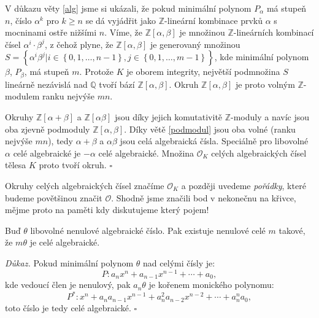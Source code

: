 \documentclass[12pt]{report}
\begin{document}
V důkazu věty \ref{alg} jsme si ukázali, že pokud minimální polynom $P_\alpha$ má stupeň $n$, číslo $\alpha^k$ pro $k \geqslant n$ se dá vyjádřit jako $\mathbb{Z}$-lineární kombinace prvků $\alpha$ s mocninami ostře nižšími $n$. Víme, že $\mathbb{Z}[\alpha,\beta]$ je množinou $\mathbb{Z}$-lineárních kombinací čísel $\alpha^i \cdot \beta^j$, z čehož plyne, že $\mathbb{Z}[\alpha,\beta]$ je generovaný množinou $S = \left\lbrace \alpha^i \beta^j \vert i \in \left\lbrace 0,1,\dots,n-1 \right\rbrace, j \in \left\lbrace 0,1,\dots,m-1 \right\rbrace \right\rbrace$, kde minimální polynom $\beta$, $P_\beta$, má stupeň $m$. Protože $K$ je oborem integrity, největší podmnožina $S$ lineárně nezávislá nad $\mathbb{Q}$ tvoří bází $\mathbb{Z}[\alpha,\beta]$. Okruh $\mathbb{Z}[\alpha,\beta]$ je proto volným $\mathbb{Z}$-modulem ranku nejvýše $mn$.

Okruhy $\mathbb{Z}[\alpha+\beta]$ a $\mathbb{Z}[\alpha \beta]$ jsou díky jejich komutativitě $\mathbb{Z}$-moduly a navíc jsou oba zjevně podmoduly $\mathbb{Z}[\alpha,\beta]$. Díky větě \ref{podmodul} jsou oba volné (ranku nejvýše $mn$), tedy $\alpha+\beta$ a $\alpha \beta$ jsou celá algebraická čísla. Speciálně pro libovolné $\alpha$ celé algebraické je $-\alpha$ celé algebraické. Množina $\mathcal{O}_K$ celých algebraických čísel tělesa $K$ proto tvoří okruh. \hfill $\square$\\

\begin{poznamka}
Okruhy celých algebraických čísel značíme $\mathcal{O}_K$ a později uvedeme \textit{pořádky}, které budeme povětšinou značit $\mathcal{O}$. Shodně jsme značili bod v nekonečnu na křivce, mějme proto na paměti kdy diskutujeme který pojem!
\end{poznamka}

\begin{lemma}\label{asob}
Buď $\theta$ libovolné nenulové algebraické číslo. Pak existuje nenulové celé $m$ takové, že $m \theta$ je celé algebraické.
\end{lemma}
\noindent \textit{Důkaz.} Pokud minimální polynom $\theta$ nad celými čísly je:
\begin{equation*}
P : a_n x^n + a_{n-1} x^{n-1} + \cdots + a_0,
\end{equation*}
kde vedoucí člen je nenulový, pak $a_n \theta$ je kořenem monického polynomu:
\begin{equation*}
P^* : x^n +a_n  a_{n-1} x^{n-1} + a_n ^2 a_{n-2} x^{n-2} + \cdots + a_n ^n a_0,
\end{equation*}
toto číslo je tedy celé algebraické. \hfill $\square$\\
\end{document}
